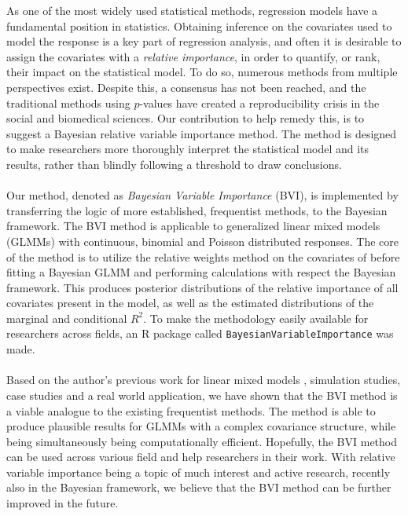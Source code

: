 As one of the most widely used statistical methods, regression models have a fundamental position in statistics. Obtaining inference on the covariates used to model the response is a key part of regression analysis, and often it is desirable to assign the covariates with a \textit{relative importance}, in order to quantify, or rank, their impact on the statistical model. To do so, numerous methods from multiple perspectives exist. Despite this, a consensus has not been reached, and the traditional methods using $p$-values have created a reproducibility crisis in the social and biomedical sciences. Our contribution to help remedy this, is to suggest a Bayesian relative variable importance method. The method is designed to make researchers more thoroughly interpret the statistical model and its results, rather than blindly following a threshold to draw conclusions.
\\
\\
Our method, denoted as \textit{Bayesian Variable Importance} (BVI), is implemented by transferring the logic of more established, frequentist methods, to the Bayesian framework. The BVI method is applicable to generalized linear mixed models (GLMMs) with continuous, binomial and Poisson distributed responses. The core of the method is to utilize the relative weights method on the covariates of before fitting a Bayesian GLMM and performing calculations with respect the Bayesian framework. This produces posterior distributions of the relative importance of all covariates present in the model, as well as the estimated distributions of the marginal and conditional $R^2$. To make the methodology easily available for researchers across fields, an R package called \texttt{BayesianVariableImportance} was made.
\\
\\
Based on the author's previous work for linear mixed models \citep{Arnstad:Relative_variable_importance_in_Bayesian_linear_mixed_models:2024}, simulation studies, case studies and a real world application, we have shown that the BVI method is a viable analogue to the existing frequentist methods. The method is able to produce plausible results for GLMMs with a complex covariance structure, while being simultaneously being computationally efficient. Hopefully, the BVI method can be used across various field and help researchers in their work. With relative variable importance being a topic of much interest and active research, recently also in the Bayesian framework, we believe that the BVI method can be further improved in the future.